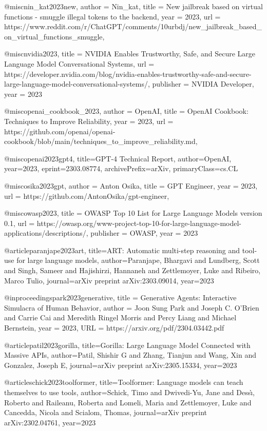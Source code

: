@misc{nin_kat2023new,
    author = {Nin_kat},
    title = {New jailbreak based on virtual functions - smuggle illegal tokens to the backend},
    year = {2023},
    url = {https://www.reddit.com/r/ChatGPT/comments/10urbdj/new_jailbreak_based_on_virtual_functions_smuggle},
}

@misc{nvidia2023,
  title = {NVIDIA Enables Trustworthy, Safe, and Secure Large Language Model Conversational Systems},
  url = {https://developer.nvidia.com/blog/nvidia-enables-trustworthy-safe-and-secure-large-language-model-conversational-systems/},
  publisher = {NVIDIA Developer},
  year = {2023}
}

@misc{openai_cookbook_2023,
  author = {OpenAI},
  title = {OpenAI Cookbook: Techniques to Improve Reliability},
  year = {2023},
  url = {https://github.com/openai/openai-cookbook/blob/main/techniques_to_improve_reliability.md},
}

@misc{openai2023gpt4,
      title={GPT-4 Technical Report},
      author={OpenAI},
      year={2023},
      eprint={2303.08774},
      archivePrefix={arXiv},
      primaryClass={cs.CL}
}

@misc{osika2023gpt,
  author = {Anton Osika},
  title = {GPT Engineer},
  year = {2023},
  url = {https://github.com/AntonOsika/gpt-engineer},
}

@misc{owasp2023,
  title = {OWASP Top 10 List for Large Language Models version 0.1},
  url = {https://owasp.org/www-project-top-10-for-large-language-model-applications/descriptions/},
  publisher = {OWASP},
  year = {2023}
}

@article{paranjape2023art,
  title={ART: Automatic multi-step reasoning and tool-use for large language models},
  author={Paranjape, Bhargavi and Lundberg, Scott and Singh, Sameer and Hajishirzi, Hannaneh and Zettlemoyer, Luke and Ribeiro, Marco Tulio},
  journal={arXiv preprint arXiv:2303.09014},
  year={2023}
}

@inproceedings{park2023generative,
title	= {Generative Agents: Interactive Simulacra of Human Behavior},
author	= {Joon Sung Park and Joseph C. O'Brien and Carrie Cai and Meredith Ringel Morris and Percy Liang and Michael Bernstein},
year	= {2023},
URL	= {https://arxiv.org/pdf/2304.03442.pdf}
}

@article{patil2023gorilla,
  title={Gorilla: Large Language Model Connected with Massive APIs},
  author={Patil, Shishir G and Zhang, Tianjun and Wang, Xin and Gonzalez, Joseph E},
  journal={arXiv preprint arXiv:2305.15334},
  year={2023}
}

@article{schick2023toolformer,
  title={Toolformer: Language models can teach themselves to use tools},
  author={Schick, Timo and Dwivedi-Yu, Jane and Dess{\`\i}, Roberto and Raileanu, Roberta and Lomeli, Maria and Zettlemoyer, Luke and Cancedda, Nicola and Scialom, Thomas},
  journal={arXiv preprint arXiv:2302.04761},
  year={2023}
}


